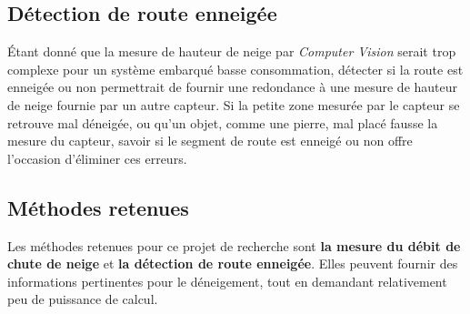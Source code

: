 \subsection{Détection de route enneigée}
Étant donné que la mesure de hauteur de neige par \emph{Computer Vision} serait trop complexe
pour un système embarqué basse consommation, détecter si la route est enneigée ou non
permettrait de fournir une redondance à une mesure de hauteur de neige fournie par un autre capteur.
Si la petite zone mesurée par le capteur se retrouve mal déneigée, ou qu'un objet, comme une pierre, mal placé
fausse la mesure du capteur, savoir si le segment de route est enneigé ou non offre l'occasion d'éliminer ces erreurs.

\subsection{Méthodes retenues}
Les méthodes retenues pour ce projet de recherche sont \textbf{la mesure du débit de chute de neige}
et \textbf{la détection de route enneigée}. Elles peuvent fournir des informations pertinentes
pour le déneigement, tout en demandant relativement peu de puissance de calcul.
\newpage
